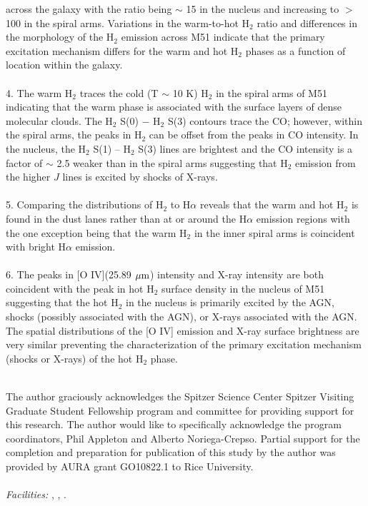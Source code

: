 \documentclass[manuscript]{aastex}
\begin{document}
across the galaxy with the ratio being $\sim$ 15 in the nucleus and
increasing to $>$ 100 in the spiral arms.  Variations in the
warm-to-hot $\mathrm{H_2}$ ratio and differences in the
morphology of the $\mathrm{H_2}$ emission across M51 indicate that the
primary excitation mechanism differs for the warm and hot
$\mathrm{H_2}$ phases as a function of location within the
galaxy.\\
\\
4. The warm H$_2$ traces the cold (T $\sim$ 10 K) H$_2$ 
in the spiral arms of M51 indicating that the warm phase is associated 
with the surface layers of dense molecular clouds.  The $\mathrm{H_2}$ S(0) $-$
$\mathrm{H_2}$ S(3) contours trace the CO; however, within the spiral
arms, the peaks in $\mathrm{H_2}$ can be offset from the peaks in CO
intensity.  In the nucleus, the $\mathrm{H_2}$ S(1) -- $\mathrm{H_2}$
S(3) lines are brightest and the CO intensity is a factor of $\sim$
2.5 weaker than in the spiral arms suggesting that $\mathrm{H_2}$
emission from the higher $J$ lines is excited by shocks of X-rays.\\
\\
5.  Comparing the distributions of $\mathrm{H_2}$ to H$\alpha$ reveals
that the warm and hot $\mathrm{H_2}$ is found in the dust lanes
rather than at or around the H$\alpha$ emission regions with the one
exception being that the warm $\mathrm{H_2}$ in the inner spiral
arms is coincident with bright H$\alpha$ emission.\\
\\
6.  The peaks in [O IV](25.89 $\mbox{$\mu$m}$) intensity and X-ray
intensity are both coincident with the peak in hot $\mathrm{H_2}$ surface density
in the nucleus of M51 suggesting that the hot $\mathrm{H_2}$ in the
nucleus is primarily excited by the AGN, shocks (possibly associated
with the AGN), or X-rays associated with the AGN.  The spatial
distributions of the [O IV] emission and X-ray surface brightness are
very similar preventing the characterization of the primary excitation 
mechanism (shocks or X-rays) of the hot H$_2$ phase.\\ 
\\

\acknowledgments

The author graciously acknowledges the Spitzer Science Center Spitzer
Visiting Graduate Student Fellowship program and committee for
providing support for this research.  The author would like to
specifically acknowledge the program coordinators, Phil Appleton and
Alberto Noriega-Crepso.  
Partial support for the completion and preparation for publication of this study by the
author was provided by AURA grant GO10822.1 to Rice
University.\\ 
\\
{\it Facilities:} , ,
.
\end{document}
